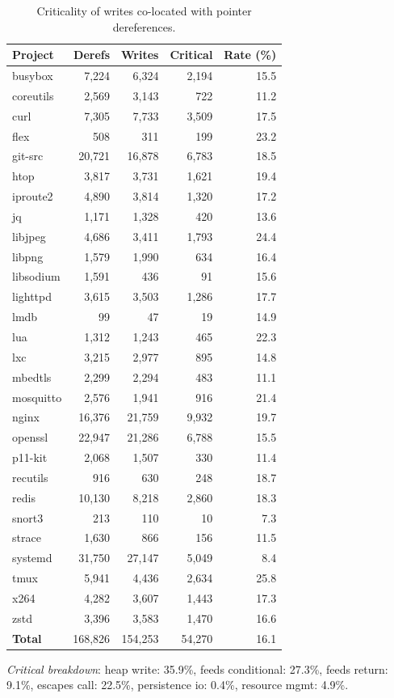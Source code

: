 \begin{table}[t]
\centering
\caption{Criticality of writes co-located with pointer dereferences.}
\label{tab:local-global-safety}
\begin{tabular}{lrrrr}
\toprule
\textbf{Project} & \textbf{Derefs} & \textbf{Writes} & \textbf{Critical} & \textbf{Rate (\%)} \\
\midrule
  busybox & 7,224 & 6,324 & 2,194 & 15.5 \\
  coreutils & 2,569 & 3,143 & 722 & 11.2 \\
  curl & 7,305 & 7,733 & 3,509 & 17.5 \\
  flex & 508 & 311 & 199 & 23.2 \\
  git-src & 20,721 & 16,878 & 6,783 & 18.5 \\
  htop & 3,817 & 3,731 & 1,621 & 19.4 \\
  iproute2 & 4,890 & 3,814 & 1,320 & 17.2 \\
  jq & 1,171 & 1,328 & 420 & 13.6 \\
  libjpeg & 4,686 & 3,411 & 1,793 & 24.4 \\
  libpng & 1,579 & 1,990 & 634 & 16.4 \\
  libsodium & 1,591 & 436 & 91 & 15.6 \\
  lighttpd & 3,615 & 3,503 & 1,286 & 17.7 \\
  lmdb & 99 & 47 & 19 & 14.9 \\
  lua & 1,312 & 1,243 & 465 & 22.3 \\
  lxc & 3,215 & 2,977 & 895 & 14.8 \\
  mbedtls & 2,299 & 2,294 & 483 & 11.1 \\
  mosquitto & 2,576 & 1,941 & 916 & 21.4 \\
  nginx & 16,376 & 21,759 & 9,932 & 19.7 \\
  openssl & 22,947 & 21,286 & 6,788 & 15.5 \\
  p11-kit & 2,068 & 1,507 & 330 & 11.4 \\
  recutils & 916 & 630 & 248 & 18.7 \\
  redis & 10,130 & 8,218 & 2,860 & 18.3 \\
  snort3 & 213 & 110 & 10 & 7.3 \\
  strace & 1,630 & 866 & 156 & 11.5 \\
  systemd & 31,750 & 27,147 & 5,049 & 8.4 \\
  tmux & 5,941 & 4,436 & 2,634 & 25.8 \\
  x264 & 4,282 & 3,607 & 1,443 & 17.3 \\
  zstd & 3,396 & 3,583 & 1,470 & 16.6 \\
\midrule
  \textbf{Total} & 168,826 & 154,253 & 54,270 & 16.1 \\
\bottomrule
\end{tabular}
\vspace{1mm}
\footnotesize
\textit{Critical breakdown}: heap write: 35.9\%, feeds conditional: 27.3\%, feeds return: 9.1\%, escapes call: 22.5\%, persistence io: 0.4\%, resource mgmt: 4.9\%.
\end{table}